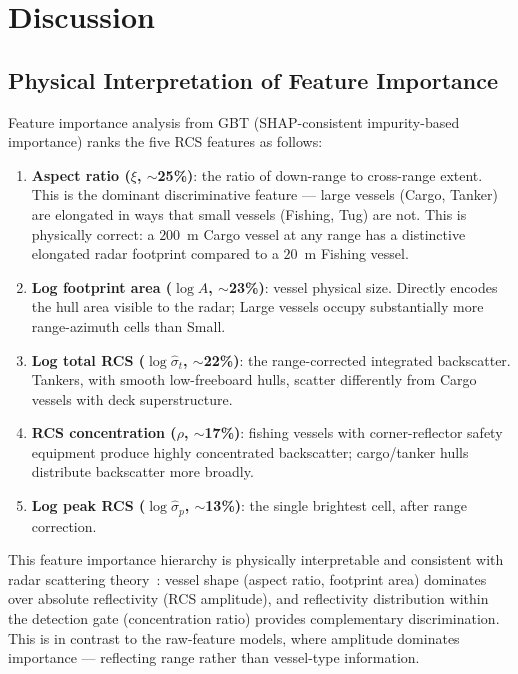 \documentclass[journal]{IEEEtran}
\begin{document}
\section{Discussion}
\label{sec:discussion}

\subsection{Physical Interpretation of Feature Importance}

Feature importance analysis from GBT (SHAP-consistent impurity-based
importance) ranks the five RCS features as follows:
\begin{enumerate}
  \item \textbf{Aspect ratio ($\xi$, $\sim$25\%)}: the ratio of
        down-range to cross-range extent. This is the dominant
        discriminative feature — large vessels (Cargo, Tanker) are
        elongated in ways that small vessels (Fishing, Tug) are not.
        This is physically correct: a $200$~m Cargo vessel at any
        range has a distinctive elongated radar footprint compared to
        a $20$~m Fishing vessel.
  \item \textbf{Log footprint area ($\log A$, $\sim$23\%)}: vessel
        physical size. Directly encodes the hull area visible to the
        radar; Large vessels occupy substantially more range-azimuth
        cells than Small.
  \item \textbf{Log total RCS ($\log\hat{\sigma}_t$, $\sim$22\%)}: the
        range-corrected integrated backscatter. Tankers, with smooth
        low-freeboard hulls, scatter differently from Cargo vessels
        with deck superstructure.
  \item \textbf{RCS concentration ($\rho$, $\sim$17\%)}: fishing
        vessels with corner-reflector safety equipment produce highly
        concentrated backscatter; cargo/tanker hulls distribute
        backscatter more broadly.
  \item \textbf{Log peak RCS ($\log\hat{\sigma}_p$, $\sim$13\%)}: the
        single brightest cell, after range correction.
\end{enumerate}

This feature importance hierarchy is physically interpretable and
consistent with radar scattering theory~\cite{knott1993rcs}: vessel
shape (aspect ratio, footprint area) dominates over absolute reflectivity
(RCS amplitude), and reflectivity distribution within the detection
gate (concentration ratio) provides complementary discrimination.
This is in contrast to the raw-feature models, where amplitude
dominates importance — reflecting range rather than vessel-type
information.
\end{document}
